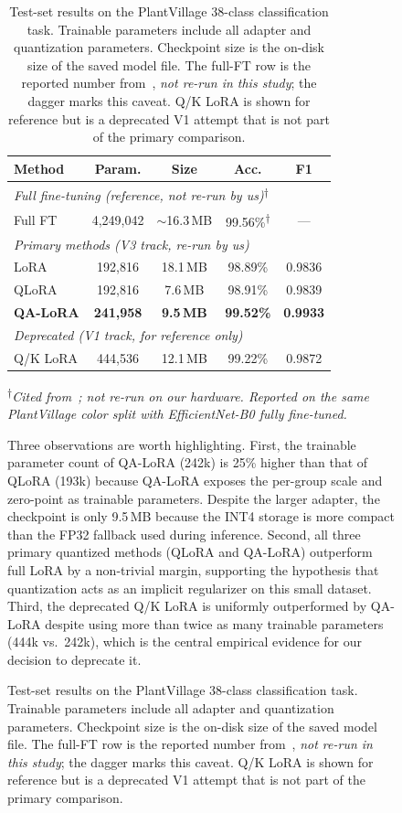 \documentclass[conference]{IEEEtran}
\begin{document}
\begin{figure}[htbp]
\begin{table}[htbp]
\caption{Test-set results on the PlantVillage 38-class classification task. Trainable parameters include all adapter and quantization parameters. Checkpoint size is the on-disk size of the saved model file. The full-FT row is the reported number from~\cite{atila2021}, \emph{not re-run in this study}; the dagger marks this caveat. Q/K LoRA is shown for reference but is a deprecated V1 attempt that is not part of the primary comparison.}
\begin{center}
\begin{tabular}{|l|c|c|c|c|}
\hline
\textbf{Method} & \textbf{Param.} & \textbf{Size} & \textbf{Acc.} & \textbf{F1} \\
\hline
\multicolumn{5}{|l|}{\textit{Full fine-tuning (reference, not re-run by us)\textsuperscript{$\dagger$}}} \\
\hline
Full FT~\cite{atila2021} & 4{,}249{,}042 & $\sim$16.3\,MB & 99.56\%\textsuperscript{$\dagger$} & --- \\
\hline
\multicolumn{5}{|l|}{\textit{Primary methods (V3 track, re-run by us)}} \\
\hline
LoRA         & 192{,}816 & 18.1\,MB & 98.89\% & 0.9836 \\
QLoRA        & 192{,}816 &  7.6\,MB & 98.91\% & 0.9839 \\
\textbf{QA-LoRA} & \textbf{241{,}958} & \textbf{ 9.5\,MB} & \textbf{99.52\%} & \textbf{0.9933} \\
\hline
\multicolumn{5}{|l|}{\textit{Deprecated (V1 track, for reference only)}} \\
\hline
Q/K LoRA     & 444{,}536 & 12.1\,MB & 99.22\% & 0.9872 \\
\hline
\end{tabular}
\label{tab:plantvillage}
\end{center}
\end{table}

\noindent\textsuperscript{$\dagger$}\textit{Cited from~\cite{atila2021}; not re-run on our hardware. Reported on the same PlantVillage color split with EfficientNet-B0 fully fine-tuned.}

Three observations are worth highlighting. First, the trainable parameter count of QA-LoRA (242k) is 25\% higher than that of QLoRA (193k) because QA-LoRA exposes the per-group scale and zero-point as trainable parameters. Despite the larger adapter, the checkpoint is only 9.5\,MB because the INT4 storage is more compact than the FP32 fallback used during inference. Second, all three primary quantized methods (QLoRA and QA-LoRA) outperform full LoRA by a non-trivial margin, supporting the hypothesis that quantization acts as an implicit regularizer on this small dataset. Third, the deprecated Q/K LoRA is uniformly outperformed by QA-LoRA despite using more than twice as many trainable parameters (444k vs.\ 242k), which is the central empirical evidence for our decision to deprecate it.


\end{figure}
\end{document}
